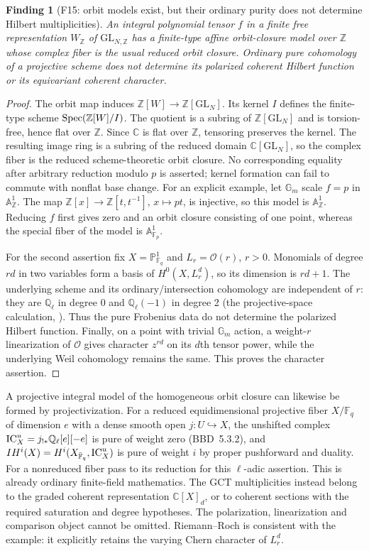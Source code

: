 \documentclass[11pt,a4paper]{article}
\newcommand{\Q}{\mathbb Q}\newcommand{\Z}{\mathbb Z}\newcommand{\C}{\mathbb C}\newcommand{\N}{\mathbb N}\newcommand{\F}{\mathbb F}
\newcommand{\A}{\mathbb A}\newcommand{\PP}{\mathbb P}\newcommand{\GL}{\mathrm{GL}}
\newcommand{\fid}[1]{\textsf{#1}}\newcommand{\gate}[1]{\textsf{#1}}
\theoremstyle{named}\newtheorem{finding}{Finding}[section]
\theoremstyle{definition}\newtheorem{definition}[finding]{Definition}
\theoremstyle{remark}\newtheorem{remark}[finding]{Remark}
\begin{document}
\begin{finding}[\fid{F15}: orbit models exist, but their ordinary purity does not determine Hilbert multiplicities]\label{f:orbit}
An integral polynomial tensor $f$ in a finite free representation $W_\Z$ of $\GL_{N,\Z}$ has a finite-type affine orbit-closure model over $\Z$ whose complex fiber is the usual reduced orbit closure. Ordinary pure cohomology of a projective scheme does not determine its polarized coherent Hilbert function or its equivariant coherent character.
\end{finding}
\begin{proof}
The orbit map induces $\Z[W]\to\Z[\GL_N]$. Its kernel $I$ defines the finite-type scheme $\Spec(\Z[W]/I)$. The quotient is a subring of $\Z[\GL_N]$ and is torsion-free, hence flat over $\Z$. Since $\C$ is flat over $\Z$, tensoring preserves the kernel. The resulting image ring is a subring of the reduced domain $\C[\GL_N]$, so the complex fiber is the reduced scheme-theoretic orbit closure. No corresponding equality after arbitrary reduction modulo $p$ is asserted; kernel formation can fail to commute with nonflat base change. For an explicit example, let $\mathbb G_m$ scale $f=p$ in $\A^1_\Z$. The map $\Z[x]\to\Z[t,t^{-1}]$, $x\mapsto pt$, is injective, so this model is $\A^1_\Z$. Reducing $f$ first gives zero and an orbit closure consisting of one point, whereas the special fiber of the model is $\A^1_{\F_p}$.

For the second assertion fix $X=\PP^1_{\F_q}$ and $L_r=\mathcal O(r)$, $r>0$. Monomials of degree $rd$ in two variables form a basis of $H^0(X,L_r^d)$, so its dimension is $rd+1$. The underlying scheme and its ordinary/intersection cohomology are independent of $r$: they are $\Q_\ell$ in degree 0 and $\Q_\ell(-1)$ in degree 2 (the projective-space calculation, \cite[Example 16.3, p.~109]{Milne}). Thus the pure Frobenius data do not determine the polarized Hilbert function. Finally, on a point with trivial $\mathbb G_m$ action, a weight-$r$ linearization of $\mathcal O$ gives character $z^{rd}$ on its $d$th tensor power, while the underlying Weil cohomology remains the same. This proves the character assertion.
\end{proof}
A projective integral model of the homogeneous orbit closure can likewise be formed by projectivization. For a reduced equidimensional projective fiber $X/\F_q$ of dimension $e$ with a dense smooth open $j:U\hookrightarrow X$, the unshifted complex $\IC_X^u=j_{!*}\Q_\ell[e][-e]$ is pure of weight zero (BBD~5.3.2), and $IH^i(X)=H^i(X_{\bar{\F}_q},\IC_X^u)$ is pure of weight $i$ by proper pushforward and duality. For a nonreduced fiber pass to its reduction for this \(\ell\)-adic assertion. This is already ordinary finite-field mathematics. The GCT multiplicities instead belong to the graded coherent representation $\C[X]_d$, or to coherent sections with the required saturation and degree hypotheses. The polarization, linearization and comparison object cannot be omitted. Riemann--Roch is consistent with the example: it explicitly retains the varying Chern character of $L_r^d$.
\end{document}
